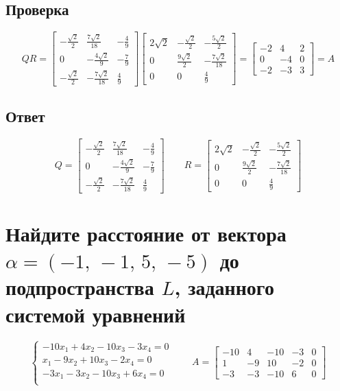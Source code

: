 \documentclass{article}
\begin{document}
  \subsection{Проверка}
  $$ QR = \left[\begin{matrix}- \frac{\sqrt{2}}{2} & \frac{7 \sqrt{2}}{18} & - \frac{4}{9}\\0 & - \frac{4 \sqrt{2}}{9} & - \frac{7}{9}\\- \frac{\sqrt{2}}{2} & - \frac{7 \sqrt{2}}{18} & \frac{4}{9}\end{matrix}\right]\left[\begin{matrix}2 \sqrt{2} & - \frac{\sqrt{2}}{2} & - \frac{5 \sqrt{2}}{2}\\0 & \frac{9 \sqrt{2}}{2} & - \frac{7 \sqrt{2}}{18}\\0 & 0 & \frac{4}{9}\end{matrix}\right] = \left[\begin{matrix}-2 & 4 & 2\\0 & -4 & 0\\-2 & -3 & 3\end{matrix}\right] = A $$

  \subsection{Ответ}
  $$ Q= \left[\begin{matrix}- \frac{\sqrt{2}}{2} & \frac{7 \sqrt{2}}{18} & - \frac{4}{9}\\0 & - \frac{4 \sqrt{2}}{9} & - \frac{7}{9}\\- \frac{\sqrt{2}}{2} & - \frac{7 \sqrt{2}}{18} & \frac{4}{9}\end{matrix}\right] \qquad R= \left[\begin{matrix}2 \sqrt{2} & - \frac{\sqrt{2}}{2} & - \frac{5 \sqrt{2}}{2}\\0 & \frac{9 \sqrt{2}}{2} & - \frac{7 \sqrt{2}}{18}\\0 & 0 & \frac{4}{9}\end{matrix}\right] $$

  \section{Найдите расстояние от вектора $\alpha = (-1,\, -1,\, 5,\, -5)$ до подпространства $L$, заданного системой уравнений}
  $$\begin{cases}
    -10x_1 + 4x_2 - 10x_3 - 3x_4 = 0 \\
    x_1 - 9x_2 + 10x_3 - 2x_4 = 0 \\
    -3x_1 - 3x_2 - 10x_3 + 6x_4 = 0 \\
  \end{cases} \qquad A = \left[\begin{matrix}-10 & 4 & -10 & -3 & 0\\1 & -9 & 10 & -2 & 0\\-3 & -3 & -10 & 6 & 0\end{matrix}\right]$$
\end{document}
